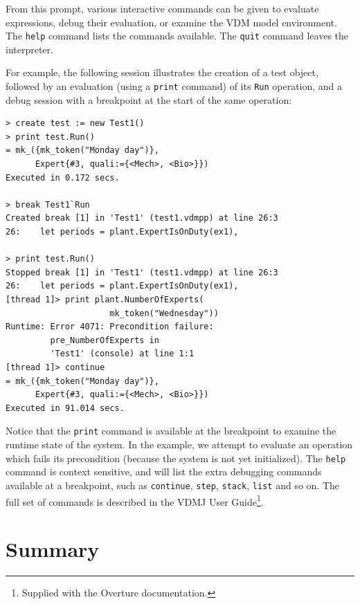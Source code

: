 \noindent From this prompt, various interactive commands can be given to
evaluate expressions, debug their evaluation, or examine the VDM model environment.
The \verb|help| command lists the commands available. The \verb|quit| command
leaves the interpreter.

For example, the following session illustrates the creation of a test object,
followed by an evaluation (using a \texttt{print} command)
of its \verb|Run| operation, and a debug
session with a breakpoint at the start of the same operation:

\begin{lstlisting}
> create test := new Test1()
> print test.Run()
= mk_({mk_token("Monday day")}, 
      Expert{#3, quali:={<Mech>, <Bio>}})
Executed in 0.172 secs.

> break Test1`Run
Created break [1] in 'Test1' (test1.vdmpp) at line 26:3
26:    let periods = plant.ExpertIsOnDuty(ex1),

> print test.Run()
Stopped break [1] in 'Test1' (test1.vdmpp) at line 26:3
26:    let periods = plant.ExpertIsOnDuty(ex1),
[thread 1]> print plant.NumberOfExperts(
                     mk_token("Wednesday"))
Runtime: Error 4071: Precondition failure: 
         pre_NumberOfExperts in 
         'Test1' (console) at line 1:1
[thread 1]> continue
= mk_({mk_token("Monday day")}, 
      Expert{#3, quali:={<Mech>, <Bio>}})
Executed in 91.014 secs. 
\end{lstlisting}

\noindent Notice that the \verb|print| command is available at the breakpoint
to examine the runtime state of the system. In the example, we attempt to evaluate an
operation which fails its precondition (because the system is not yet
initialized). The \verb|help| command is context sensitive, and will list the
extra debugging commands available at a breakpoint, such as \verb|continue|,
\verb|step|, \verb|stack|, \verb|list| and so on. The full set of commands is
described in the VDMJ User Guide\footnote{Supplied with the Overture
documentation.}.

\lstset{style=mystyle,language=VDM++}

\section{Summary}\label{sec:toolintrosummary}


